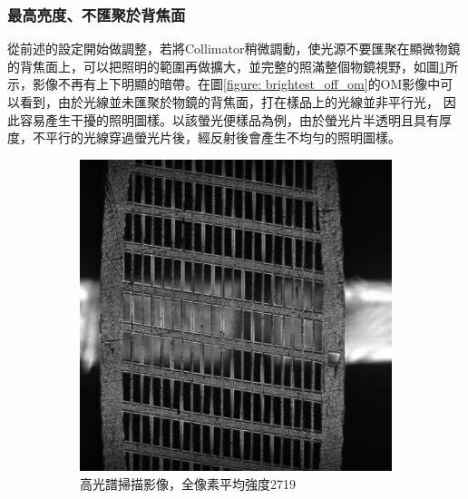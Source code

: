 \documentclass[12pt]{article}
\begin{document}
\subsubsection{最高亮度、不匯聚於背焦面}
從前述的設定開始做調整，若將Collimator稍微調動，使光源不要匯聚在顯微物鏡的背焦面上，可以把照明的範圍再做擴大，並完整的照滿整個物鏡視野，如圖\ref{figure: brightest_off}所示，影像不再有上下明顯的暗帶。在圖\ref{figure: brightest_off_om}的OM影像中可以看到，由於光線並未匯聚於物鏡的背焦面，打在樣品上的光線並非平行光，
因此容易產生干擾的照明圖樣。以該螢光便樣品為例，由於螢光片半透明且具有厚度，不平行的光線穿過螢光片後，經反射後會產生不均勻的照明圖樣。
\begin{figure}
    \centering
    \begin{subfigure}[t]{0.45\textwidth}
        \centering
        \includegraphics[width=\linewidth]{off_brightest.jpg}
        \caption{高光譜掃描影像，全像素平均強度2719}
        \label{figure: brightest_off}
    \end{subfigure}
    \begin{subfigure}[t]{0.45\textwidth}
        \centering

\end{subfigure}
\end{figure}
\end{document}
